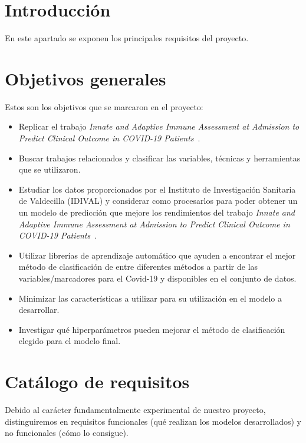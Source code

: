 
\section{Introducción}

En este apartado se exponen los principales requisitos del proyecto.

\section{Objetivos generales}

Estos son los objetivos que se marcaron en el proyecto:

\begin{itemize}
    \item Replicar el trabajo \textit{Innate and Adaptive Immune Assessment at Admission to Predict Clinical Outcome in COVID-19 Patients}~\cite{sansegundo:2021}.
    \item Buscar trabajos relacionados y clasificar las variables, técnicas y herramientas que se utilizaron.
	\item Estudiar los datos proporcionados por el Instituto de Investigación Sanitaria de Valdecilla (IDIVAL) y considerar como procesarlos para poder obtener un un modelo de predicción que mejore los rendimientos del trabajo \textit{Innate and Adaptive Immune Assessment at Admission to Predict Clinical Outcome in COVID-19 Patients}~\cite{sansegundo:2021}.
    \item Utilizar librerías de aprendizaje automático que ayuden a encontrar el mejor método de clasificación de entre diferentes métodos a partir de las variables/marcadores para el Covid-19 y disponibles en el conjunto de datos.
    \item Minimizar las características a utilizar para su utilización en el modelo a desarrollar.
    \item Investigar qué hiperparámetros pueden mejorar el método de clasificación elegido para el modelo final.
\end{itemize}

\section{Catálogo de requisitos}

Debido al carácter fundamentalmente experimental de nuestro proyecto, distinguiremos en requisitos funcionales (qué realizan los modelos desarrollados) y no funcionales (cómo lo consigue).

